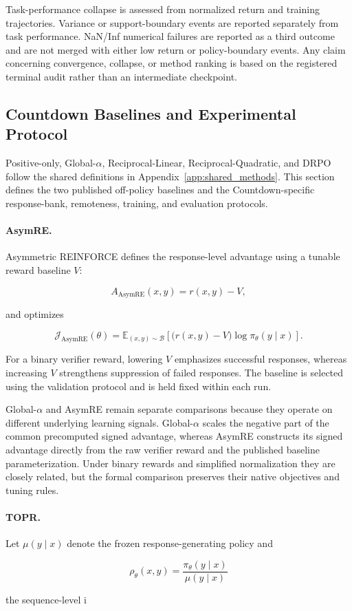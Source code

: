 Task-performance collapse is assessed from normalized return and
training trajectories. Variance or support-boundary events are reported
separately from task performance. NaN/Inf numerical failures are
reported as a third outcome and are not merged with either low return or
policy-boundary events. Any claim concerning convergence, collapse, or
method ranking is based on the registered terminal audit rather than an
intermediate checkpoint.


\subsection{Countdown Baselines and Experimental Protocol}
\label{app:countdown_methods}

Positive-only, Global-\(\alpha\), Reciprocal-Linear,
Reciprocal-Quadratic, and DRPO follow the shared definitions in
Appendix~\ref{app:shared_methods}. This section defines the two
published off-policy baselines and the Countdown-specific response-bank,
remoteness, training, and evaluation protocols.

\paragraph{AsymRE.}

Asymmetric REINFORCE defines the response-level advantage using a
tunable reward baseline \(V\):

\[
A_{\mathrm{AsymRE}}(x,y)
=
r(x,y)-V,
\]

and optimizes

\[
\mathcal{J}_{\mathrm{AsymRE}}(\theta)
=
\mathbb{E}_{(x,y)\sim\mathcal{B}}
\left[
\bigl(r(x,y)-V\bigr)
\log\pi_\theta(y\mid x)
\right].
\]

For a binary verifier reward, lowering \(V\) emphasizes successful
responses, whereas increasing \(V\) strengthens suppression of failed
responses. The baseline is selected using the validation protocol and
is held fixed within each run.

Global-\(\alpha\) and AsymRE remain separate comparisons because they
operate on different underlying learning signals. Global-\(\alpha\)
scales the negative part of the common precomputed signed advantage,
whereas AsymRE constructs its signed advantage directly from the raw
verifier reward and the published baseline parameterization. Under
binary rewards and simplified normalization they are closely related,
but the formal comparison preserves their native objectives and tuning
rules.

\paragraph{TOPR.}

Let \(\mu(y\mid x)\) denote the frozen response-generating policy and

\[
\rho_\theta(x,y)
=
\frac{\pi_\theta(y\mid x)}
     {\mu(y\mid x)}
\]

the sequence-level i